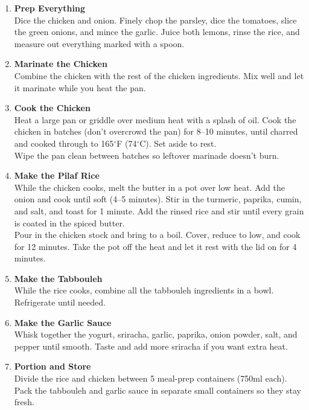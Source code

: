 \begin{enumerate}

      \item \textbf{Prep Everything} \\
            Dice the chicken and onion. Finely chop the parsley, dice the tomatoes, slice the green onions, and mince the garlic. Juice both lemons, rinse the rice, and measure out everything marked with a spoon.

      \item \textbf{Marinate the Chicken} \\
            Combine the chicken with the rest of the chicken ingredients. Mix well and let it marinate while you heat the pan.

      \item \textbf{Cook the Chicken} \\
            Heat a large pan or griddle over medium heat with a splash of oil. Cook the chicken in batches (don't overcrowd the pan) for 8--10 minutes, until charred and cooked through to 165$^\circ$F (74$^\circ$C). Set aside to rest. \\
            Wipe the pan clean between batches so leftover marinade doesn't burn.

      \item \textbf{Make the Pilaf Rice} \\
            While the chicken cooks, melt the butter in a pot over low heat. Add the onion and cook until soft (4--5 minutes). Stir in the turmeric, paprika, cumin, and salt, and toast for 1 minute. Add the rinsed rice and stir until every grain is coated in the spiced butter. \\
            Pour in the chicken stock and bring to a boil. Cover, reduce to low, and cook for 12 minutes. Take the pot off the heat and let it rest with the lid on for 4 minutes.

      \item \textbf{Make the Tabbouleh} \\
            While the rice cooks, combine all the tabbouleh ingredients in a bowl. Refrigerate until needed.

      \item \textbf{Make the Garlic Sauce} \\
            Whisk together the yogurt, sriracha, garlic, paprika, onion powder, salt, and pepper until smooth. Taste and add more sriracha if you want extra heat.

      \item \textbf{Portion and Store} \\
            Divide the rice and chicken between 5 meal-prep containers (750ml each). Pack the tabbouleh and garlic sauce in separate small containers so they stay fresh.

\end{enumerate}




